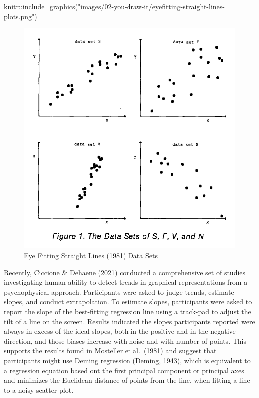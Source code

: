 \documentclass[print]{nuthesis}
\newenvironment{Shaded}{\begin{snugshade}}{\end{snugshade}}
\newcommand{\FunctionTok}[1]{\textcolor[rgb]{0.00,0.00,0.00}{#1}}
\newcommand{\NormalTok}[1]{#1}
\newcommand{\SpecialCharTok}[1]{\textcolor[rgb]{0.00,0.00,0.00}{#1}}
\newcommand{\StringTok}[1]{\textcolor[rgb]{0.31,0.60,0.02}{#1}}
\begin{document}
\begin{Shaded}
\begin{Highlighting}[]
\NormalTok{knitr}\SpecialCharTok{::}\FunctionTok{include\_graphics}\NormalTok{(}\StringTok{"images/02{-}you{-}draw{-}it/eyefitting{-}straight{-}lines{-}plots.png"}\NormalTok{)}
\end{Highlighting}
\end{Shaded}

\begin{figure}
\includegraphics[width=0.7\linewidth]{images/02-you-draw-it/eyefitting-straight-lines-plots} \caption{Eye Fitting Straight Lines (1981) Data Sets}\label{fig:mosteller-eyefitting-plot}
\end{figure}

Recently, Ciccione \& Dehaene (2021) conducted a comprehensive set of studies investigating human ability to detect trends in graphical representations from a psychophysical approach.
Participants were asked to judge trends, estimate slopes, and conduct extrapolation.
To estimate slopes, participants were asked to report the slope of the best-fitting regression line using a track-pad to adjust the tilt of a line on the screen.
Results indicated the slopes participants reported were always in excess of the ideal slopes, both in the positive and in the negative direction, and those biases increase with noise and with number of points.
This supports the results found in Mosteller et al.~(1981) and suggest that participants might use Deming regression (Deming, 1943), which is equivalent to a regression equation based ont the first principal component or principal axes and minimizes the Euclidean distance of points from the line, when fitting a line to a noisy scatter-plot.
\end{document}
